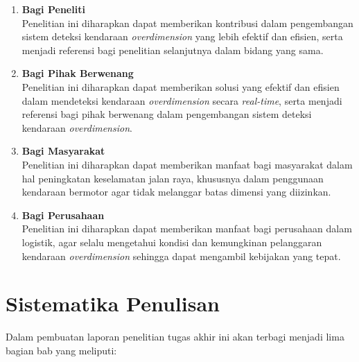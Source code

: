 \begin{enumerate}[nolistsep]

  \item \textbf{Bagi Peneliti} \\
      Penelitian ini diharapkan dapat memberikan kontribusi dalam pengembangan sistem deteksi kendaraan \emph{overdimension} yang lebih efektif dan efisien, serta menjadi referensi bagi penelitian selanjutnya dalam bidang yang sama.

  \item \textbf{Bagi Pihak Berwenang} \\
      Penelitian ini diharapkan dapat memberikan solusi yang efektif dan efisien dalam mendeteksi kendaraan \emph{overdimension} secara \emph{real-time}, serta menjadi referensi bagi pihak berwenang dalam pengembangan sistem deteksi kendaraan \emph{overdimension}.

  \item \textbf{Bagi Masyarakat} \\
      Penelitian ini diharapkan dapat memberikan manfaat bagi masyarakat dalam hal peningkatan keselamatan jalan raya, khususnya dalam penggunaan kendaraan bermotor agar tidak melanggar batas dimensi yang diizinkan.

  \item \textbf{Bagi Perusahaan} \\
      Penelitian ini diharapkan dapat memberikan manfaat bagi perusahaan dalam logistik, agar selalu mengetahui kondisi dan kemungkinan pelanggaran kendaraan \emph{overdimension} sehingga dapat mengambil kebijakan yang tepat.

\end{enumerate}

\section{Sistematika Penulisan}
\label{sec:sistematikapenulisan
}

Dalam pembuatan laporan penelitian tugas akhir ini akan terbagi menjadi lima bagian bab yang meliputi:

